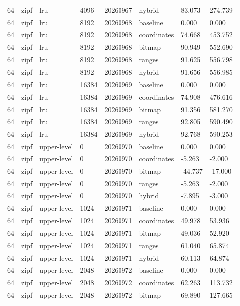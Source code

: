 \begin{tabular}{llllllll}
64 & zipf & lru & 4096 & 20260967 & hybrid & 83.073 & 274.739 \\
64 & zipf & lru & 8192 & 20260968 & baseline & 0.000 & 0.000 \\
64 & zipf & lru & 8192 & 20260968 & coordinates & 74.668 & 453.752 \\
64 & zipf & lru & 8192 & 20260968 & bitmap & 90.949 & 552.690 \\
64 & zipf & lru & 8192 & 20260968 & ranges & 91.625 & 556.798 \\
64 & zipf & lru & 8192 & 20260968 & hybrid & 91.656 & 556.985 \\
64 & zipf & lru & 16384 & 20260969 & baseline & 0.000 & 0.000 \\
64 & zipf & lru & 16384 & 20260969 & coordinates & 74.908 & 476.616 \\
64 & zipf & lru & 16384 & 20260969 & bitmap & 91.356 & 581.270 \\
64 & zipf & lru & 16384 & 20260969 & ranges & 92.805 & 590.490 \\
64 & zipf & lru & 16384 & 20260969 & hybrid & 92.768 & 590.253 \\
64 & zipf & upper-level & 0 & 20260970 & baseline & 0.000 & 0.000 \\
64 & zipf & upper-level & 0 & 20260970 & coordinates & -5.263 & -2.000 \\
64 & zipf & upper-level & 0 & 20260970 & bitmap & -44.737 & -17.000 \\
64 & zipf & upper-level & 0 & 20260970 & ranges & -5.263 & -2.000 \\
64 & zipf & upper-level & 0 & 20260970 & hybrid & -7.895 & -3.000 \\
64 & zipf & upper-level & 1024 & 20260971 & baseline & 0.000 & 0.000 \\
64 & zipf & upper-level & 1024 & 20260971 & coordinates & 49.978 & 53.936 \\
64 & zipf & upper-level & 1024 & 20260971 & bitmap & 49.036 & 52.920 \\
64 & zipf & upper-level & 1024 & 20260971 & ranges & 61.040 & 65.874 \\
64 & zipf & upper-level & 1024 & 20260971 & hybrid & 60.113 & 64.874 \\
64 & zipf & upper-level & 2048 & 20260972 & baseline & 0.000 & 0.000 \\
64 & zipf & upper-level & 2048 & 20260972 & coordinates & 62.263 & 113.732 \\
64 & zipf & upper-level & 2048 & 20260972 & bitmap & 69.890 & 127.665 \\

\end{tabular}
